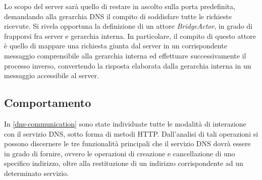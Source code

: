 \documentclass[a4paper,12pt]{report}
\begin{document}
Lo scopo del server sarà quello di restare in ascolto sulla porta predefinita, demandando alla gerarchia DNS il compito di soddisfare tutte le richieste ricevute. Si rivela opportuna la definizione di un attore \emph{BridgeActor}, in grado di frapporsi fra server e gerarchia interna. In particolare, il compito di questo attore è quello di mappare una richiesta giunta dal server in un corrispondente messaggio comprensibile alla gerarchia interna ed effettuare successivamente il processo inverso, convertendo la risposta elaborata dalla gerarchia interna in un messaggio accessibile al server.

\subsection{Comportamento}
In \autoref{dns-communication} sono state individuate tutte le modalità di interazione con il servizio DNS, sotto forma di metodi HTTP. Dall'analisi di tali operazioni si possono discernere le tre funzionalità principali che il servizio DNS dovrà essere in grado di fornire, ovvero le operazioni di creazione e cancellazione di uno specifico indirizzo, oltre alla restituzione di un indirizzo corrispondente ad un determinato servizio.
\end{document}
